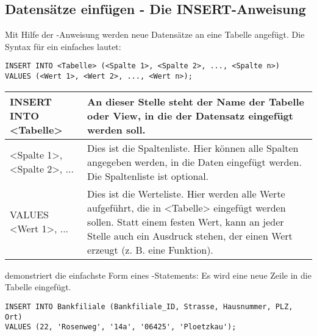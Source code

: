 \subsection{Datensätze einfügen - Die INSERT-Anweisung}
Mit Hilfe der \INSERT-Anweisung werden neue Datensätze an eine Tabelle
angefügt. Die Syntax für ein einfaches \INSERT lautet:
\begin{lstlisting}[language=oracle_sql,caption={Die INSERT Anweisungen},label=sql07_01]
INSERT INTO <Tabelle> (<Spalte 1>, <Spalte 2>, ..., <Spalte n>)
VALUES (<Wert 1>, <Wert 2>, ..., <Wert n>);
        \end{lstlisting}
\begin{center}
    \label{insertsyntax}
    \begin{small}
        \tabletail{
            \hline
        }
        \tablelasttail{
            \hline
        }
        \begin{supertabular}{|l|p{10.8cm}|}
            INSERT INTO <Tabelle> & An dieser Stelle steht der Name der
            Tabelle oder View, in die der Datensatz eingefügt werden soll.
            \\
            \hline
            <Spalte 1>, <Spalte 2>, ... & Dies ist die Spaltenliste. Hier
            können alle Spalten angegeben werden, in die Daten eingefügt
            werden. Die Spaltenliste ist optional. \\
            \hline
            VALUES <Wert 1>, ... & Dies ist die Werteliste. Hier werden alle
            Werte aufgeführt, die in <Tabelle> eingefügt werden sollen.
            Statt einem festen Wert, kann an jeder Stelle auch ein Ausdruck
            stehen, der einen Wert erzeugt (z. B. eine Funktion). \\
        \end{supertabular}
    \end{small}
\end{center}
 demonstriert die einfachste Form eines
\INSERT-Statements: Es wird eine neue Zeile in die Tabelle
 eingefügt.
\begin{lstlisting}[language=oracle_sql,caption={Ein einfaches INSERT},label=sql07_02]
INSERT INTO Bankfiliale (Bankfiliale_ID, Strasse, Hausnummer, PLZ, Ort)
VALUES (22, 'Rosenweg', '14a', '06425', 'Ploetzkau');
        \end{lstlisting}
